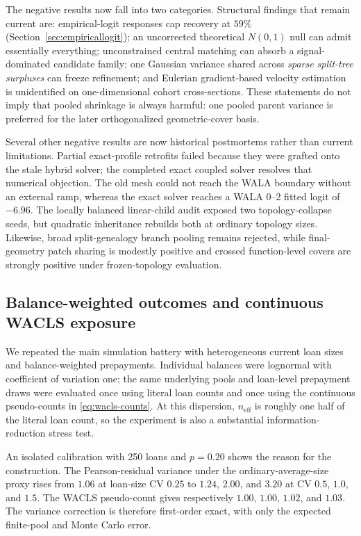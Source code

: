 \documentclass[11pt]{article}
\begin{document}
The negative results now fall into two categories. Structural findings that remain current are:
empirical-logit responses cap recovery at $59\%$ (Section~\ref{sec:empiricallogit}); an
uncorrected theoretical $N(0,1)$ null can admit essentially everything; unconstrained central
matching can absorb a signal-dominated candidate family; one Gaussian variance shared across
\emph{sparse split-tree surpluses} can freeze refinement; and Eulerian gradient-based velocity
estimation is unidentified on one-dimensional cohort cross-sections. These statements do not imply
that pooled shrinkage is always harmful: one pooled parent variance is preferred for the later
orthogonalized geometric-cover basis.

Several other negative results are now historical postmortems rather than current limitations.
Partial exact-profile retrofits failed because they were grafted onto the stale hybrid solver; the
completed exact coupled solver resolves that numerical objection. The old mesh could not reach the
WALA boundary without an external ramp, whereas the exact solver reaches a WALA 0--2 fitted logit of
$-6.96$. The locally balanced linear-child audit exposed two topology-collapse seeds, but quadratic
inheritance rebuilds both at ordinary topology sizes. Likewise, broad split-genealogy branch pooling
remains rejected, while final-geometry patch sharing is modestly positive and crossed function-level
covers are strongly positive under frozen-topology evaluation.

\subsection{Balance-weighted outcomes and continuous WACLS exposure}
\label{sec:wacls-sims}

We repeated the main simulation battery with heterogeneous current loan sizes
and balance-weighted prepayments.  Individual balances were lognormal with
coefficient of variation one; the same underlying pools and loan-level
prepayment draws were evaluated once using literal loan counts and once using
the continuous pseudo-counts in \eqref{eq:wacls-counts}.  At this dispersion,
$n_{\mathrm{eff}}$ is roughly one half of the literal loan count, so the
experiment is also a substantial information-reduction stress test.

An isolated calibration with 250 loans and $p=0.20$ shows the reason for the
construction.  The Pearson-residual variance under the ordinary-average-size
proxy rises from $1.06$ at loan-size CV $0.25$ to $1.24$, $2.00$, and $3.20$
at CV $0.5$, $1.0$, and $1.5$.  The WACLS pseudo-count gives respectively
$1.00$, $1.00$, $1.02$, and $1.03$.  The variance correction is therefore
first-order exact, with only the expected finite-pool and Monte Carlo error.
\end{document}
